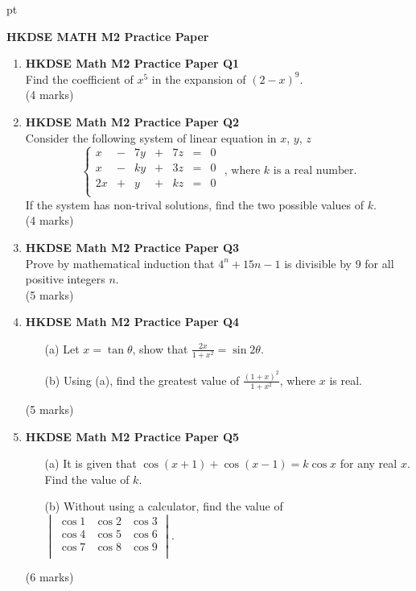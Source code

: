 \documentclass[12pt]{article}
\begin{document}
 pt
\begin{center}
	{\large \bf HKDSE MATH M2 Practice Paper}\\
	\vspace{2 mm}

\end{center}
\vspace{0.05cm}

\begin{enumerate}
	\item \textbf{HKDSE Math M2 Practice Paper Q1}\\
	Find the coefficient of $x^5$ in the expansion of $(2-x)^9$. \\(4 marks)


	\item \textbf{HKDSE Math M2 Practice Paper Q2}\\
	Consider the following system of linear equation in $x$, $y$, $z$
	$$\left\{\begin{matrix}
		x & - & 7y & + & 7z & = & 0\\
		x & - & ky & + & 3z & = & 0\\
		2x & + & y & + & kz & = & 0\\
	\end{matrix}\right.\text{ , where }k\text{ is a real number.}$$
	If the system has non-trival solutions, find the two possible values of $k$. \\(4 marks)


	\item \textbf{HKDSE Math M2 Practice Paper Q3}\\
	Prove by mathematical induction that $4^n+15n - 1$ is divisible by 9 for all positive integers $n$. \\(5 marks)
		

	\item \textbf{HKDSE Math M2 Practice Paper Q4}
	\begin{enumerate}
		\item [(a)]Let $x = \tan{\theta}$, show that $\displaystyle\frac{2x}{1+x^2} = \sin{2\theta}$. 
		\item [(b)]Using (a), find the greatest value of $\displaystyle\frac{(1+x)^2}{1+x^2}$, where $x$ is real.
	\end{enumerate}
	(5 marks)

	\item \textbf{HKDSE Math M2 Practice Paper Q5}
	\begin{enumerate}
		\item [(a)]It is given that $\cos{(x+1)} + \cos{(x-1)} = k\cos{x}$ for any real $x$. Find the value of $k$. 
		\item [(b)]Without using a calculator, find the value of $\begin{vmatrix}
			\cos{1} & \cos{2} & \cos{3}\\
			\cos{4} & \cos{5} & \cos{6}\\
			\cos{7} & \cos{8} & \cos{9}\\
		\end{vmatrix}$.
	\end{enumerate}
	(6 marks)


\end{enumerate}
\end{document}
